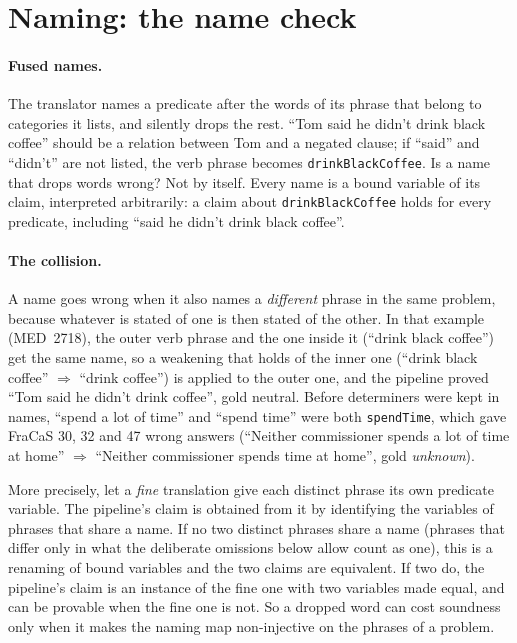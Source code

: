 \documentclass[11pt]{article}
\newcommand{\unk}{\textit{unknown}}
\newcommand{\nm}[1]{\texttt{#1}}
\begin{document}
\section{Naming: the name check}
\label{sec:names}

\paragraph{Fused names.} The translator names a predicate after the
words of its phrase that belong to categories it lists, and silently
drops the rest. ``Tom said he didn't drink black coffee'' should be a
relation between Tom and a negated clause; if ``said'' and ``didn't''
are not listed, the verb phrase becomes \nm{drinkBlackCoffee}. Is a
name that drops words wrong? Not by itself. Every name is a bound
variable of its claim, interpreted arbitrarily: a claim about
\nm{drinkBlackCoffee} holds for every predicate, including ``said he
didn't drink black coffee''.

\paragraph{The collision.} A name goes wrong when it also names a
\emph{different} phrase in the same problem, because whatever is
stated of one is then stated of the other. In that example (MED~2718), the outer
verb phrase and the one inside it (``drink black coffee'') get the same
name, so a weakening that holds of the inner one (``drink black coffee''
$\Rightarrow$ ``drink coffee'') is applied to the outer one, and the
pipeline proved ``Tom said he didn't drink coffee'', gold neutral.
Before determiners were kept in names, ``spend a lot of time'' and
``spend time'' were both \nm{spendTime}, which gave FraCaS 30, 32 and
47 wrong answers (``Neither commissioner spends a lot of time at home''
$\Rightarrow$ ``Neither commissioner spends time at home'', gold \unk{}).

More precisely, let a \emph{fine} translation give each distinct phrase
its own predicate variable. The pipeline's claim is obtained from it by
identifying the variables of phrases that share a name. If no two
distinct phrases share a name (phrases that differ only in what the
deliberate omissions below allow count as one), this is a renaming of
bound variables and the two claims are equivalent. If two do, the pipeline's claim is
an instance of the fine one with two variables made equal, and can be
provable when the fine one is not. So a dropped word can cost soundness
only when it makes the naming map non-injective on the phrases of a
problem.
\end{document}
